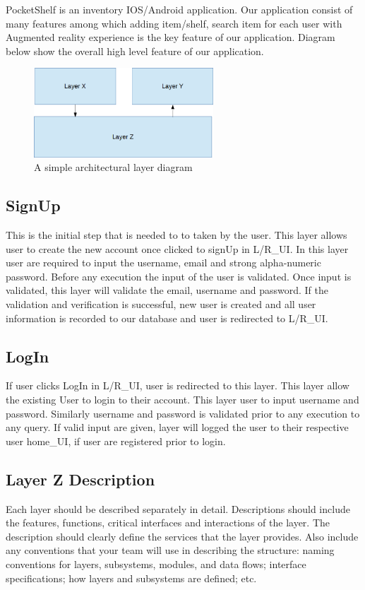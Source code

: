 PocketShelf is an inventory IOS/Android application. Our application consist of many features among which adding item/shelf, search item for each user with Augmented reality experience is the key feature of our application. Diagram below show the overall high level feature of our application.


\begin{figure}[h!]
	\centering
 	\includegraphics[width=0.60\textwidth]{images/layers}
 \caption{A simple architectural layer diagram}
\end{figure}

\subsection{SignUp}
This is the initial step that is needed to to taken by the user. This layer allows user to create the new account once clicked to signUp in L/R\_UI. In this layer user are required to input the username, email and strong alpha-numeric password. Before any execution the input of the user is validated. Once input is validated, this layer will validate the email, username and password. If the validation and verification is successful, new user is created and all user information is recorded to our database and user is redirected to L/R\_UI.

\subsection{LogIn}
If user clicks LogIn in L/R\_UI, user is redirected to this layer. This layer allow the existing User to login to their account. This layer user to input username and password. Similarly username and password is validated prior to any execution to any query. If valid input are given, layer will logged the user to their respective user home\_UI, if user are registered prior to login.

\subsection{Layer Z Description}
Each layer should be described separately in detail. Descriptions should include the features, functions, critical interfaces and interactions of the layer. The description should clearly define the services that the layer provides. Also include any conventions that your team will use in describing the structure: naming conventions for layers, subsystems, modules, and data flows; interface specifications; how layers and subsystems are defined; etc. 